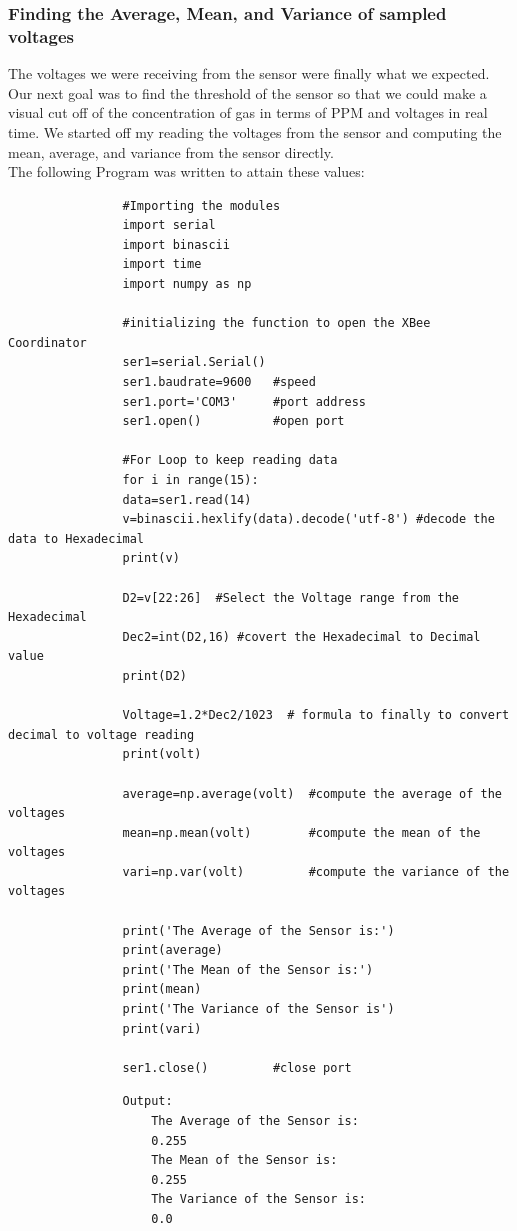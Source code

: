 		\subsubsection{Finding the Average, Mean, and Variance of sampled voltages}
			\par The voltages we were receiving from the sensor were finally what we expected. Our next goal was to find the threshold of the sensor so that we could make a visual cut off of the concentration of gas in terms of PPM and voltages in real time. We started off my reading the voltages from the sensor and computing the mean, average, and variance from the sensor directly.\\
			The following Program was written to attain these values: \\
			\begin{lstlisting}
				#Importing the modules				
				import serial				
				import binascii				
				import time				
				import numpy as np
								
				#initializing the function to open the XBee Coordinator				
				ser1=serial.Serial()				
				ser1.baudrate=9600   #speed				
				ser1.port='COM3'     #port address				
				ser1.open()          #open port
								
				#For Loop to keep reading data			
				for i in range(15):				
				data=ser1.read(14)				
				v=binascii.hexlify(data).decode('utf-8') #decode the data to Hexadecimal				
				print(v)
								
				D2=v[22:26]  #Select the Voltage range from the Hexadecimal				
				Dec2=int(D2,16) #covert the Hexadecimal to Decimal value 			
				print(D2)				
				
				Voltage=1.2*Dec2/1023  # formula to finally to convert decimal to voltage reading												
				print(volt)				
				
				average=np.average(volt)  #compute the average of the voltages				
				mean=np.mean(volt)        #compute the mean of the voltages
				vari=np.var(volt)         #compute the variance of the voltages

				print('The Average of the Sensor is:')
				print(average)
				print('The Mean of the Sensor is:')
				print(mean)
				print('The Variance of the Sensor is')
				print(vari)
				
				ser1.close()         #close port
			\end{lstlisting}
			\begin{lstlisting}
				Output:
					The Average of the Sensor is:
					0.255
					The Mean of the Sensor is:
					0.255
					The Variance of the Sensor is:
					0.0
			\end{lstlisting}
